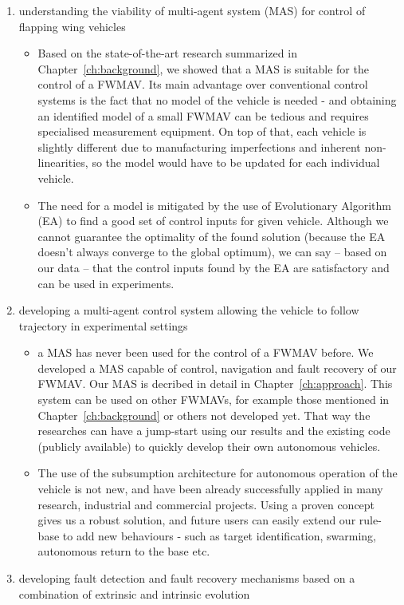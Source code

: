 \begin{enumerate}
\item understanding the viability of multi-agent system (MAS) for control of flapping wing vehicles
	\begin{itemize}
	\item Based on the state-of-the-art research summarized in Chapter~\ref{ch:background}, we showed that a MAS is suitable for the control of a FWMAV. Its main advantage over conventional control systems is the fact that no model of the vehicle is needed - and obtaining an identified model of a small FWMAV can be tedious and requires specialised measurement equipment. On top of that, each vehicle is slightly different due to manufacturing imperfections and inherent non-linearities, so the model would have to be updated for each individual vehicle.
	\item The need for a model is mitigated by the use of Evolutionary Algorithm (EA) to find a good set of control inputs for given vehicle. Although we cannot guarantee the optimality of the found solution (because the EA doesn't always converge to the global optimum), we can say -- based on our data -- that the control inputs found by the EA are satisfactory and can be used in experiments.
	\end{itemize}
\item developing a multi-agent control system allowing the vehicle to follow trajectory in experimental settings
	\begin{itemize}
	\item a MAS has never been used for the control of a FWMAV before. We developed a MAS capable of control, navigation and fault recovery of our FWMAV. Our MAS is decribed in detail in Chapter~\ref{ch:approach}. This system can be used on other FWMAVs, for example those mentioned in Chapter~\ref{ch:background} or others not developed yet. That way the researches can have a jump-start using our results and the existing code (publicly available) to quickly develop their own autonomous vehicles.
	\item The use of the subsumption architecture for autonomous operation of the vehicle is not new, and have been already successfully applied in many research, industrial and commercial projects. Using a proven concept gives us a robust solution, and future users can easily extend our rule-base to add new behaviours - such as target identification, swarming, autonomous return to the base etc.
	\end{itemize}
\item developing fault detection and fault recovery mechanisms based on a combination of extrinsic and intrinsic evolution

\end{enumerate}
